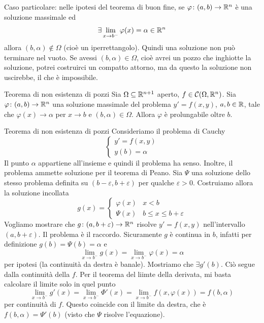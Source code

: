 \documentclass[a4paper]{article}
\begin{document}
Caso particolare: nelle ipotesi del teorema di buon fine, se
\(\varphi \colon (a,b) \to \mathbb{R}^n\)
è una soluzione massimale ed
\[
    \exists \lim_{x \to b^-} \varphi(x) = \alpha \in \mathbb{R}^n
\]
allora \((b, \alpha) \notin \Omega\) (cioè un iperrettangolo).
Quindi una soluzione non può terminare nel vuoto.
Se avessi \((b, \alpha) \in \Omega\), cioè avrei un pozzo che inghiotte la soluzione, potrei costruirci un compatto attorno, ma da questo
la soluzione non uscirebbe, il che è impossibile.

\begin{snippettheorem}{Teorema di non esistenza di pozzi}
    Sia \(\Omega \subseteq \mathbb{R}^{n+1}\) aperto,
    \(f \in \mathcal C(\Omega, \mathbb{R}^n)\).
    Sia \(\varphi \colon (a,b) \to \mathbb{R}^n\)
    una soluzione massimale del problema \(y'=f(x,y)\),
    \(a,b\in \mathbb{R}\), tale che \(\varphi(x) \to \alpha\) per \(x \to b\)
    e \((b, \alpha) \in \Omega\).
    Allora \(\varphi\) è prolungabile oltre \(b\).
\end{snippettheorem}

\begin{snippetproof}{Teorema di non esistenza di pozzi}
    Consideriamo il problema di Cauchy
    \[
        \begin{cases}
            y' = f(x,y) \\
            y(b) = \alpha
        \end{cases}
    \]
    Il punto \(\alpha\) appartiene all'insieme e quindi il problema ha senso.
    Inoltre, il problema ammette soluzione per il teorema di Peano.
    Sia \(\Psi\) una soluzione dello stesso problema definita su \((b-\varepsilon, b+\varepsilon)\)
    per qualche \(\varepsilon > 0\). Costruiamo allora la soluzione incollata
    \[
        g(x) = \begin{cases}
            \varphi(x) & x < b \\
            \Psi(x) & b \leq x \leq b + \varepsilon
        \end{cases}
    \]
    Vogliamo mostrare che \(g \colon (a,b+\varepsilon) \to \mathbb{R}^n\)
    risolve \(y' = f(x,y)\) nell'intervallo \((a,b+\varepsilon)\).
    Il problema è il raccordo.
    Sicuramente \(g\) è continua in \(b\), infatti per definizione
    \(g(b) = \Psi(b) = \alpha\) e \[
        \lim_{x \to b^-} g(x) = \lim_{x \to b^-} \varphi(x) = \alpha
    \]
    per ipotesi (la continuità da destra è banale).
    Mostriamo che \(\exists g'(b)\).
    Ciò segue dalla continuità della \(f\).
    Per il teorema del liimte della derivata, mi basta
    calcolare il limite solo in quel punto
    \[
        \lim_{x\to b^-} g'(x) = \lim_{x\to b^-} \Phi'(x)
        = \lim_{x\to b^-} f(x,\varphi(x)) = f(b,\alpha)
    \]
    per continuità di \(f\).
    Questo coincide con il limite da destra, che è \(f(b,\alpha) = \Psi'(b)\)
    (visto che \(\Psi\) risolve l'equazione).
\end{snippetproof}
\end{document}

